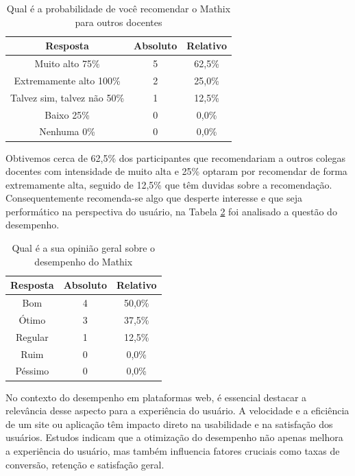 \begin{table}[h!]
    \centering
    \caption{Qual é a probabilidade de você recomendar o Mathix para outros docentes}
    \begin{tabular}{c|c|c}
        \textbf{Resposta} &	\textbf{Absoluto} & \textbf{Relativo} \\
        \hline
        Muito alto 75\% & 5 & 62,5\% \\
        \hline
        Extremamente alto 100\% & 2 & 25,0\% \\
        \hline
        Talvez sim, talvez não 50\% & 1 & 12,5\% \\
        \hline
        Baixo 25\% & 0 & 0,0\% \\
        \hline
        Nenhuma 0\% & 0 & 0,0\% \\
    \end{tabular}
    \label{tab:ui-1}
\end{table}

Obtivemos cerca de 62,5\% dos participantes que recomendariam a outros colegas docentes com intensidade de muito alta e 25\% optaram por recomendar de forma extremamente alta, seguido de 12,5\% que têm duvidas sobre a recomendação. Consequentemente recomenda-se algo que desperte interesse e que seja performático na perspectiva do usuário, na Tabela \ref{tab:ui-2} foi analisado a questão do desempenho.


\begin{table}[h!]
    \centering
    \caption{Qual é a sua opinião geral sobre o desempenho do Mathix}
    \begin{tabular}{c|c|c}
        \textbf{Resposta} &	\textbf{Absoluto} & \textbf{Relativo} \\
        \hline
        Bom & 4 & 50,0\% \\
        \hline
        Ótimo & 3 & 37,5\% \\
        \hline
        Regular & 1 & 12,5\% \\
        \hline
        Ruim & 0 & 0,0\% \\
        \hline
        Péssimo & 0 & 0,0\% \\
    \end{tabular}
    \label{tab:ui-2}
\end{table}

No contexto do desempenho em plataformas web, é essencial destacar a relevância desse aspecto para a experiência do usuário. A velocidade e a eficiência de um site ou aplicação têm impacto direto na usabilidade e na satisfação dos usuários. Estudos indicam que a otimização do desempenho não apenas melhora a experiência do usuário, mas também influencia fatores cruciais como taxas de conversão, retenção e satisfação geral.


